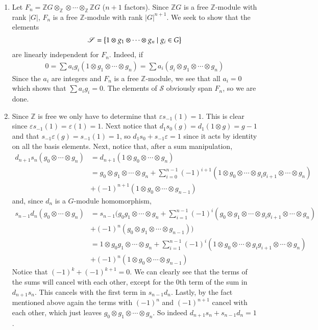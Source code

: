 \documentclass[12pt]{article}
\theoremstyle{definition}
\theoremstyle{definitionstyle}
\def\mbb#1{\mathbb{#1}}
\def\ve{\varepsilon}
\newcommand{\SET}[1]{\Set{\mskip-\medmuskip #1 \mskip-\medmuskip}}
\newcommand{\Z}{\mbb Z}
\begin{document}
    \begin{enumerate}[label=(\alph*)]
        \item Let $F_n = \Z G \otimes_\Z \otimes \cdots \otimes_\Z \Z G$ ($n+1$ factors). Since $\Z G$ is a free $\Z$-module with rank $|G|$, $F_n$ is a free $\Z$-module with rank $|G|^{n+1}$. We seek to show that the elements
        \begin{align*}
            \mathscr S = \SET{1 \otimes g_1 \otimes \cdots \otimes g_n \mid g_i \in G}
        \end{align*}
        are linearly independent for $F_n$. Indeed, if
        \begin{align*}
            0 = \sum a_ig_i (1 \otimes g_1 \otimes \cdots \otimes g_n) = \sum a_i (g_i \otimes g_1 \otimes \cdots \otimes g_n)
        \end{align*}
        Since the $a_i$ are integers and $F_n$ is a free $\Z$-module, we see that all $a_i = 0$ which shows that $\sum a_ig_i = 0$. The elements of $\mathscr S$ obviously span $F_n$, so we are done.

        \item Since $\Z$ is free we only have to determine that $\ve s_{-1}(1) = 1$. This is clear since $\ve s_{-1}(1) = \ve(1) = 1$. Next notice that $d_1s_0(g) = d_1(1 \otimes g) = g - 1$ and that $s_{-1} \ve(g) = s_{-1}(1) = 1$, so $d_1s_0 + s_{-1}\ve = 1$ since it acts by identity on all the basis elements. Next, notice that, after a sum manipulation,
        \begin{align*}
            d_{n+1}s_n(g_0 \otimes \cdots \otimes g_n) &= d_{n+1}(1 \otimes g_0 \otimes \cdots \otimes g_n) \\&= g_0 \otimes g_1 \otimes \cdots \otimes g_n + \sum_{i=0}^{n-1} (-1)^{i+1} (1 \otimes g_0 \otimes \cdots \otimes g_ig_{i+1} \otimes \cdots \otimes g_n) \\ &+ (-1)^{n+1} (1 \otimes g_0 \otimes \cdots \otimes g_{n-1})
        \end{align*}
        and, since $d_n$ is a $G$-module homomorphism,
        \begin{align*}
            s_{n-1}d_n(g_0 \otimes \cdots \otimes g_n) &= s_{n-1}\bigg(g_0g_1 \otimes \cdots \otimes g_n + \sum_{i=1}^{n-1} (-1)^i (g_0 \otimes g_1 \otimes \cdots \otimes g_ig_{i+1} \otimes \cdots \otimes g_n) 
            \\& + (-1)^n (g_0 \otimes g_1 \otimes \cdots \otimes g_{n-1})\bigg)
            \\&= 1 \otimes g_0g_1 \otimes \cdots \otimes g_n + \sum_{i=1}^{n-1} (-1)^i (1 \otimes g_0 \otimes \cdots \otimes g_ig_{i+1} \otimes \cdots \otimes g_n) \\
            &+ (-1)^n (1 \otimes g_0 \otimes \cdots \otimes g_{n-1})
        \end{align*}
        Notice that $(-1)^k + (-1)^{k+1} = 0$. We can clearly see that the terms of the sums will cancel with each other, except for the 0th term of the sum in $d_{n+1}s_n$. This cancels with the first term in $s_{n-1}d_n$. Lastly, by the fact mentioned above again the terms with $(-1)^n$ and $(-1)^{n+1}$ cancel with each other, which just leaves $g_0 \otimes g_1 \otimes \cdots \otimes g_n$. So indeed $d_{n+1}s_n + s_{n-1}d_n = 1$.


\end{enumerate}
\end{document}
